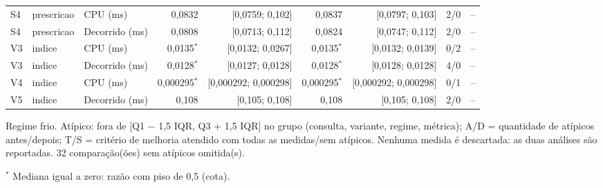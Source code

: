 {\begin{tabular}{lllrrrrrc}
S4 & prescricao & CPU (ms) & 0,0832 & [0,0759; 0,102] & 0,0837 & [0,0797; 0,103] & 2/0 & -- \\
S4 & prescricao & Decorrido (ms) & 0,0808 & [0,0713; 0,112] & 0,0824 & [0,0747; 0,112] & 2/0 & -- \\
V3 & indice & CPU (ms) & 0,0135$^{*}$ & [0,0132; 0,0267] & 0,0135$^{*}$ & [0,0132; 0,0139] & 0/2 & -- \\
V3 & indice & Decorrido (ms) & 0,0128$^{*}$ & [0,0127; 0,0128] & 0,0128$^{*}$ & [0,0128; 0,0128] & 4/0 & -- \\
V4 & indice & CPU (ms) & 0,000295$^{*}$ & [0,000292; 0,000298] & 0,000295$^{*}$ & [0,000292; 0,000298] & 0/1 & -- \\
V5 & indice & Decorrido (ms) & 0,108 & [0,105; 0,108] & 0,108 & [0,105; 0,108] & 2/0 & -- \\
\bottomrule
\end{tabular}\par
\vspace{3pt}
\begin{minipage}{\linewidth}\footnotesize
Regime frio. Atípico: fora de [Q1 $-$ 1,5 IQR, Q3 + 1,5 IQR] no grupo (consulta, variante, regime, métrica); A/D = quantidade de atípicos antes/depois; T/S = critério de melhoria atendido com todas as medidas/sem atípicos. Nenhuma medida é descartada: as duas análises são reportadas. 32 comparação(ões) sem atípicos omitida(s).\par
$^{*}$ Mediana igual a zero: razão com piso de 0,5 (cota).
\end{minipage}
}
